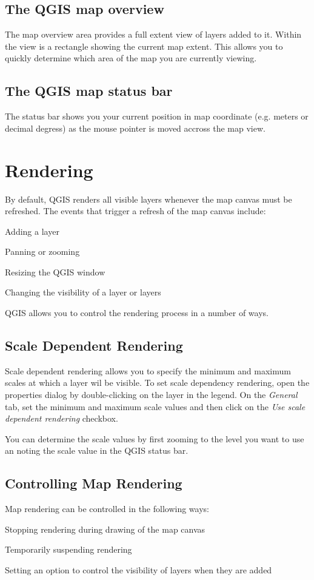 \subsection{The QGIS map overview}
The map overview area provides a full extent view of layers added to it. Within the view is a rectangle showing the current map extent. This allows you to quickly determine which area of the map you are currently viewing.

\subsection{The QGIS map status bar} 
The status bar shows you your current position in map coordinate (e.g. meters
or decimal degress) as the mouse pointer is moved accross the map view.

\section{Rendering}\label{subsec:redraw_events}
By default, QGIS renders all visible layers whenever the map canvas must be refreshed. The events that trigger a refresh of the map canvas include:
\begin{compactitem}
\item Adding a layer
\item Panning or zooming
\item Resizing the QGIS window
\item Changing the visibility of a layer or layers
\end{compactitem}
QGIS allows you to control the rendering process in a number of ways.
\subsection{Scale Dependent Rendering}
Scale dependent rendering allows you to specify the minimum and maximum scales
at which a layer wil be visible.  To set scale dependency rendering, open the
properties dialog by double-clicking on the layer in the legend. On the
\textit{General} tab, set the minimum and maximum scale values and then click on
the \textit{Use scale dependent rendering} checkbox.

You can determine the scale values by first zooming to the level you want to use
an noting the scale value in the QGIS status bar.
\subsection{Controlling Map Rendering}
Map rendering can be controlled in the following ways:
\begin{compactenum}
\item Stopping rendering during drawing of the map canvas
\item Temporarily suspending rendering
\item Setting an option to control the visibility of layers when they are added
\end{compactenum}
